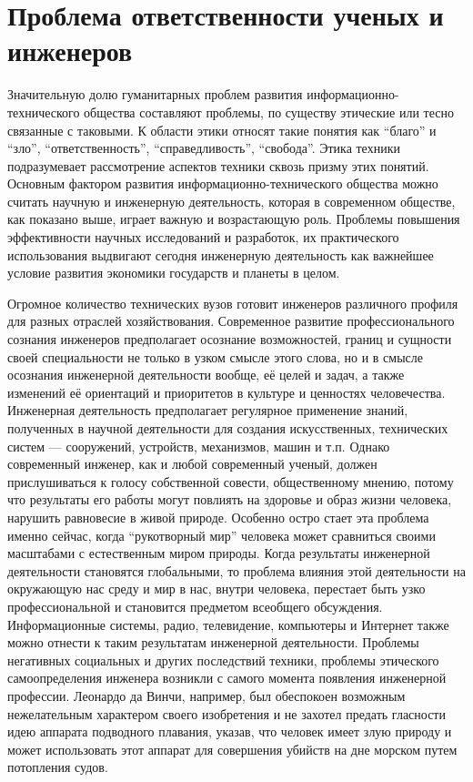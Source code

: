 \section{Проблема ответственности ученых и инженеров}

Значительную долю гуманитарных проблем развития информационно-технического общества составляют проблемы, по существу этические или тесно связанные с таковыми. К области этики относят такие понятия как ``благо'' и ``зло'', ``ответственность'', ``справедливость'', ``свобода''. Этика техники подразумевает рассмотрение аспектов техники сквозь призму этих понятий.  Основным фактором развития информационно-технического общества можно считать научную и инженерную деятельность, которая в современном обществе, как показано выше, играет важную и возрастающую роль. Проблемы повышения эффективности научных исследований и разработок, их практического использования выдвигают сегодня инженерную деятельность как важнейшее условие развития экономики государств и планеты в целом.

Огромное количество технических вузов готовит инженеров различного профиля для разных отраслей хозяйствования. Современное развитие профессионального сознания инженеров предполагает осознание возможностей, границ и сущности своей специальности не только в узком смысле этого слова, но и в смысле осознания инженерной деятельности вообще, её целей и задач, а также изменений её ориентаций и приоритетов в культуре и ценностях человечества. Инженерная деятельность предполагает регулярное применение знаний, полученных в научной деятельности для создания искусственных, технических систем --- сооружений, устройств, механизмов, машин и т.п. Однако современный инженер, как и любой современный ученый, должен прислушиваться к голосу собственной совести, общественному мнению, потому что результаты его работы могут повлиять на здоровье и образ жизни человека, нарушить равновесие в живой природе. Особенно остро стает эта проблема именно сейчас, когда ``рукотворный мир'' человека может сравниться своими масштабами с естественным миром природы. Когда результаты инженерной деятельности становятся глобальными, то проблема влияния этой деятельности на окружающую нас среду и мир в нас, внутри человека, перестает быть узко профессиональной и становится предметом всеобщего обсуждения. Информационные системы, радио, телевидение, компьютеры и Интернет также можно отнести к таким результатам инженерной деятельности.  Проблемы негативных социальных и других последствий техники, проблемы этического самоопределения инженера возникли с самого момента появления инженерной профессии. Леонардо да Винчи, например, был обеспокоен возможным нежелательным характером своего изобретения и не захотел предать гласности идею аппарата подводного плавания, указав, что человек имеет злую природу и может использовать этот аппарат для совершения убийств на дне морском путем потопления судов.

